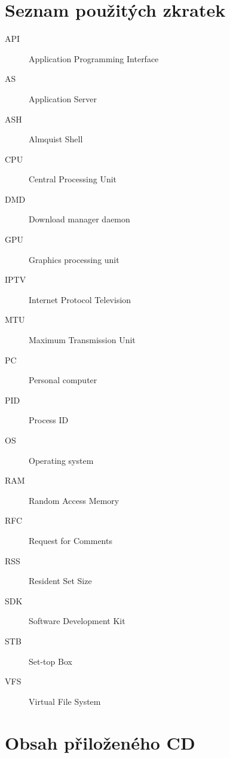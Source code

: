 \documentclass[thesis=B,czech]{FITthesis}[2012/06/26]
\begin{document}
\chapter{Seznam použitých zkratek}
\begin{description}
	\item[API] Application Programming Interface
	\item[AS] Application Server
	\item[ASH] Almquist Shell
	\item[CPU] Central Processing Unit
	\item[DMD] Download manager daemon
	\item[GPU] Graphics processing unit
	\item[IPTV] Internet Protocol Television
	\item[MTU] Maximum Transmission Unit
	\item[PC] Personal computer
	\item[PID] Process ID
	\item[OS] Operating system
	\item[RAM] Random Access Memory
	\item[RFC] Request for Comments
	\item[RSS] Resident Set Size
	\item[SDK] Software Development Kit
	\item[STB] Set-top Box
	\item[VFS] Virtual File System
\end{description}

\chapter{Obsah přiloženého CD}

\begin{figure}
\end{figure}
\end{document}
